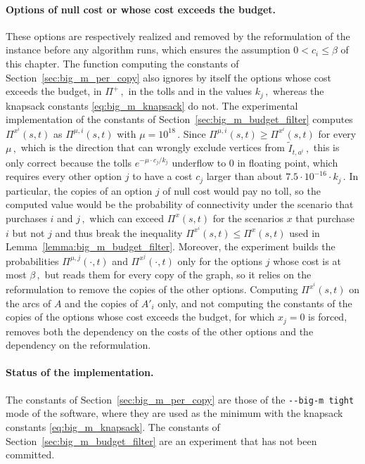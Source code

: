 \documentclass[11pt,a4paper]{report}
\theoremstyle{definition}
\theoremstyle{remark}
\begin{document}
\noindent
\paragraph{Options of null cost or whose cost exceeds the budget.}
These options are respectively realized and removed by the reformulation of the instance before any algorithm runs, which ensures the assumption $0 < c_i \leq \beta$ of this chapter. The function computing the constants of Section~\ref{sec:big_m_per_copy} also ignores by itself the options whose cost exceeds the budget, in $\Pi^+\,,$ in the tolls and in the values $k_j\,,$ whereas the knapsack constants \eqref{eq:big_m_knapsack} do not. The experimental implementation of the constants of Section~\ref{sec:big_m_budget_filter} computes $\Pi^{x^i}(s,t)$ as $\Pi^{\mu,i}(s,t)$ with $\mu = 10^{18}\,.$ Since $\Pi^{\mu,i}(s,t) \geq \Pi^{x^i}(s,t)$ for every $\mu\,,$ which is the direction that can wrongly exclude vertices from $\tilde{I}_{t,a^i}\,,$ this is only correct because the tolls $e^{-\mu \cdot c_j / k_j}$ underflow to $0$ in floating point, which requires every other option $j$ to have a cost $c_j$ larger than about $7.5 \cdot 10^{-16} \cdot k_j\,.$ In particular, the copies of an option $j$ of null cost would pay no toll, so the computed value would be the probability of connectivity under the scenario that purchases $i$ and $j\,,$ which can exceed $\Pi^x(s,t)$ for the scenarios $x$ that purchase $i$ but not $j$ and thus break the inequality $\Pi^{x^i}(s,t) \leq \Pi^x(s,t)$ used in Lemma~\ref{lemma:big_m_budget_filter}. Moreover, the experiment builds the probabilities $\Pi^{\mu,j}(\cdot,t)$ and $\Pi^{x^j}(\cdot,t)$ only for the options $j$ whose cost is at most $\beta\,,$ but reads them for every copy of the graph, so it relies on the reformulation to remove the copies of the other options. Computing $\Pi^{x^i}(s,t)$ on the arcs of $A$ and the copies of $A'_i$ only, and not computing the constants of the copies of the options whose cost exceeds the budget, for which $x_j = 0$ is forced, removes both the dependency on the costs of the other options and the dependency on the reformulation.

\noindent
\paragraph{Status of the implementation.}
The constants of Section~\ref{sec:big_m_per_copy} are those of the \texttt{-{}-big-m tight} mode of the software, where they are used as the minimum with the knapsack constants \eqref{eq:big_m_knapsack}. The constants of Section~\ref{sec:big_m_budget_filter} are an experiment that has not been committed.
\end{document}
